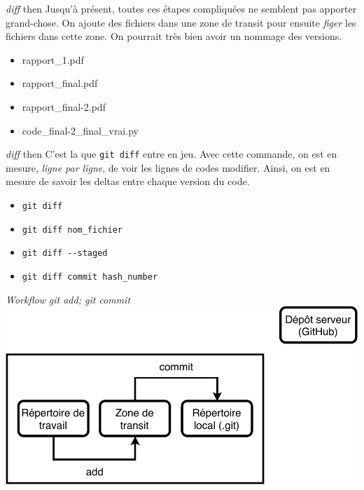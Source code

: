 \documentclass[11pt]{beamer}
\begin{document}
\begin{frame}[fragile]{\textit{diff} then}
	Jusqu'à présent, toutes ces étapes compliquées ne semblent pas apporter grand-chose. On ajoute des fichiers dans une zone de transit pour ensuite \textit{figer} les fichiers dans cette zone. On pourrait très bien avoir un nommage des versions. 
	\begin{itemize}
		\item rapport\_1.pdf
		\item rapport\_final.pdf
		\item rapport\_final-2.pdf
		\item code\_final-2\_final\_vrai.py
	\end{itemize}
\end{frame}

\begin{frame}[fragile]{\textit{diff} then}
	C'est la que \verb|git diff| entre en jeu. Avec cette commande, on est en mesure, \textit{ligne par ligne}, de voir les lignes de codes modifier. Ainsi, on est en mesure de savoir les deltas entre chaque version du code.
	\begin{itemize}[<+->]
		\item \verb|git diff|
		\item \verb|git diff nom_fichier|
		\item \verb|git diff --staged|
		\item \verb|git diff commit hash_number|
	\end{itemize}
\end{frame}

\begin{frame}{\textit{Workflow} \textit{git add; git commit}}
	\includegraphics[width=0.95\linewidth,height=0.95\textheight,keepaspectratio]{add_commit.pdf}
\end{frame}
\end{document}
